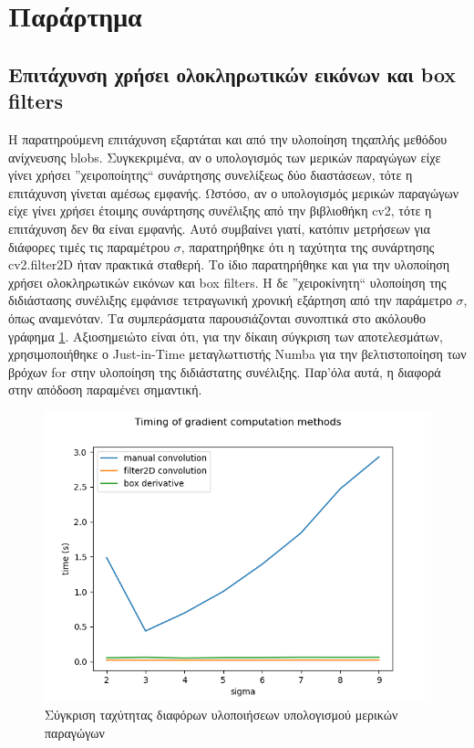 \documentclass{article}
\newcommand{\eng}[1]{\foreignlanguage{english}{#1}}
\begin{document}
\newpage
\section{Παράρτημα}
\subsection{Επιτάχυνση χρήσει ολοκληρωτικών εικόνων και \eng{box filters}}
\label{section:details}

Η παρατηρούμενη επιτάχυνση εξαρτάται και από την υλοποίηση τηςαπλής μεθόδου ανίχνευσης \eng{blobs}. Συγκεκριμένα, αν ο υπολογισμός των μερικών παραγώγων είχε γίνει χρήσει ''χειροποίητης`` συνάρτησης συνελίξεως δύο διαστάσεων, τότε η επιτάχυνση γίνεται αμέσως εμφανής. Ωστόσο, αν ο υπολογισμός μερικών παραγώγων είχε γίνει χρήσει έτοιμης συνάρτησης συνέλιξης από την βιβλιοθήκη \eng{cv2}, τότε η επιτάχυνση δεν θα είναι εμφανής. Αυτό συμβαίνει γιατί, κατόπιν μετρήσεων για διάφορες τιμές τις παραμέτρου $\sigma$, παρατηρήθηκε ότι η ταχύτητα της συνάρτησης  \eng{cv2.filter2D} ήταν πρακτικά σταθερή. Το ίδιο παρατηρήθηκε και για την υλοποίηση χρήσει ολοκληρωτικών εικόνων και \eng{box filters}. Η δε ''χειροκίνητη`` υλοποίηση της διδιάστασης συνέλιξης εμφάνισε τετραγωνική χρονική εξάρτηση από την παράμετρο $\sigma$, όπως αναμενόταν. Τα συμπεράσματα παρουσιάζονται συνοπτικά στο ακόλουθο γράφημα \ref{fig:grad-comparison}. Αξιοσημειώτο είναι ότι, για την δίκαιη σύγκριση των αποτελεσμάτων, χρησιμοποιήθηκε ο \eng{Just-in-Time} μεταγλωττιστής \eng{Numba} για την βελτιστοποίηση των βρόχων \eng{for} στην υλοποίηση της διδιάστατης συνέλιξης. Παρ'όλα αυτά, η διαφορά στην απόδοση παραμένει σημαντική.

\begin{figure}[h]
    \centering
    \includegraphics[width=\textwidth]{../image-plots/grad-comparison.png}
    \caption{Σύγκριση ταχύτητας διαφόρων υλοποιήσεων υπολογισμού μερικών παραγώγων}
    \label{fig:grad-comparison}
\end{figure}
\FloatBarrier
\end{document}
